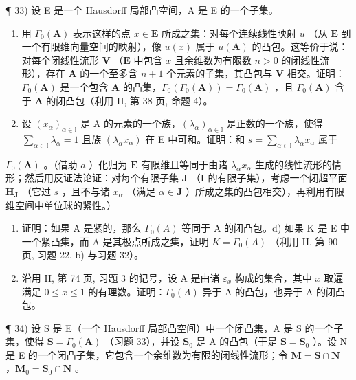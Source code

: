¶ 33) 设 E 是一个 Hausdorff 局部凸空间，A 是 E 的一个子集。

\begin{enumerate}
\def\labelenumi{\alph{enumi})}
\item
  用 \(\Gamma_0(\mathbf{A})\) 表示这样的点 \(x \in \mathbf{E}\) 所成之集：对每个连续线性映射 \(u\) （从 \(\mathbf{E}\) 到一个有限维向量空间的映射），像 \(u(x)\) 属于 \(u(\mathbf{A})\) 的凸包。这等价于说：对每个闭线性流形 \(\mathbf{V}\) （\(\mathbf{E}\) 中包含 \(x\) 且余维数为有限数 \(n > 0\) 的闭线性流形），存在 \(\mathbf{A}\) 的一个至多含 \(n + 1\) 个元素的子集，其凸包与 \(\mathbf{V}\) 相交。证明：\(\Gamma_0(\mathbf{A})\) 是一个包含 \(\mathbf{A}\) 的凸集，\(\Gamma_0(\Gamma_0(\mathbf{A})) = \Gamma_0(\mathbf{A})\) ，且 \(\Gamma_0(\mathbf{A})\) 含于 \(\mathbf{A}\) 的闭凸包（利用 II, 第 38 页, 命题 4）。
\item
  设 \((x_{\alpha})_{\alpha \in \mathbb{I}}\) 是 A 的元素的一个族，\((\lambda_{\alpha})_{\alpha \in \mathbb{I}}\) 是正数的一个族，使得 \(\sum_{\alpha \in \mathbb{I}}\lambda_{\alpha} = 1\) 且族 \((\lambda_{\alpha}x_{\alpha})\) 在 E 中可和。证明：和 \(s = \sum_{\alpha \in \mathbb{I}}\lambda_{\alpha}x_{\alpha}\) 属于
\end{enumerate}

\(\Gamma_0(\mathbf{A})\) 。（借助 \(a\) ）化归为 \(\mathbf{E}\) 有限维且等同于由诸 \(\lambda_{\alpha}x_{\alpha}\) 生成的线性流形的情形；然后用反证法论证：对每个有限子集 \(\mathbf{J}\) （\(\mathbf{I}\) 的有限子集），考虑一个闭超平面 \(\mathbf{H}_{\mathbf{J}}\) （它过 \(s\) ，且不与诸 \(x_{\alpha}\) （满足 \(\alpha \in \mathbf{J}\) ）所成之集的凸包相交），再利用有限维空间中单位球的紧性。）

\begin{enumerate}
\def\labelenumi{\alph{enumi})}
\setcounter{enumi}{2}
\item
  证明：如果 A 是紧的，那么 \(\Gamma_0(A)\) 等同于 A 的闭凸包。d) 如果 K 是 E 中一个紧凸集，而 A 是其极点所成之集，证明 \(K = \Gamma_0(A)\) （利用 II, 第 90 页, 习题 22, b) 与习题 32）。
\item
  沿用 II, 第 74 页, 习题 3 的记号，设 A 是由诸 \(\varepsilon_{x}\) 构成的集合，其中 \(x\) 取遍满足 \(0 \leqslant x \leqslant 1\) 的有理数。证明：\(\Gamma_0(A)\) 异于 A 的凸包，也异于 A 的闭凸包。
\end{enumerate}

¶ 34) 设 S 是 E（一个 Hausdorff 局部凸空间）中一个闭凸集，A 是 S 的一个子集，使得 \(\mathbf{S} = \Gamma_0(\mathbf{A})\) （习题 33），并设 \(\mathbf{S}_0\) 是 A 的凸包（于是 \(\mathbf{S} = \bar{\mathbf{S}}_0\) ）。设 N 是 E 的一个闭凸子集，它包含一个余维数为有限的闭线性流形；令 \(\mathbf{M} = \mathbf{S} \cap \mathbf{N}\) ，\(\mathbf{M}_0 = \mathbf{S}_0 \cap \mathbf{N}\) 。

